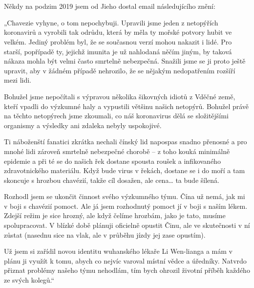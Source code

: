 \chapter{}

Někdy na podzim 2019 jsem od Jieho dostal email následujícího znění: 

„Chavezie vyhyne, o tom nepochybuji. Upravili jsme jeden z netopýřích koronavirů a vyrobili tak odrůdu, která by měla ty mořské potvory hubit ve velkém. Jediný problém byl, že se současnou verzí mohou nakazit i lidé. Pro starší, popřípadě ty, jejichž imunita je už nahlodaná něčím jiným, by taková nákaza mohla být velmi často smrtelně nebezpečná. Snažili jsme se ji proto ještě upravit, aby v žádném případě nehrozilo, že se nějakým nedopatřením rozšíří mezi lidi.

Bohužel jsme nepočítali s výpravou několika šikovných idiotů z Vděčné země, kteří vpadli do výzkumné haly a vypustili většinu našich netopýrů. Bohužel právě na těchto netopýrech jsme zkoumali, co náš koronavirus dělá se složitějšími organismy a výsledky ani zdaleka nebyly uspokojivé.

Ti náboženští fanatici zkrátka nechali čínský lid napospas snadno přenosné a pro mnohé lidi zároveň smrtelně nebezpečné chorobě – z toho kouká minimálně epidemie a při té se do našich řek dostane spousta roušek a infikovaného zdravotnického materiálu. Když bude virus v řekách, dostane se i do moří a tam skoncuje s hrozbou chavézií, takže cíl dosažen, ale cena… ta bude šílená.

Rozhodl jsem se ukončit činnost svého výzkumného týmu. Čína už nemá, jak mi v boji s chavézií pomoct. Ale já jsem rozhodnutý pomoct jí v boji s naším lékem. Zdejší režim je sice hrozný, ale když čelíme hrozbám, jako je tato, musíme spolupracovat. V blízké době plánuji oficielně opustit Činu, ale ve skutečnosti v ní zůstat (nasednu sice na vlak, ale v průběhu jízdy jej zase opustím).

Už jsem si zařídil novou identitu wuhanského lékaře Li Wen-lianga a mám v plánu ji využít k tomu, abych co nejvíc varoval místní vědce a úředníky. Natvrdo přiznat problémy našeho týmu nehodlám, tím bych ohrozil životní příběh každého ze svých kolegů.“
